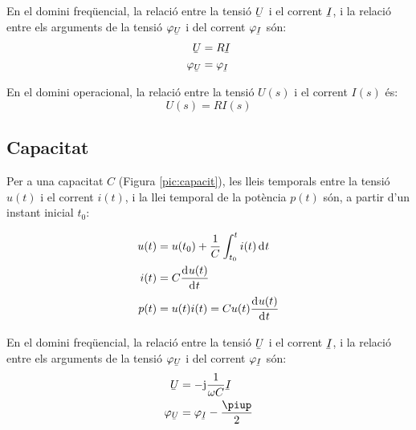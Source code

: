 En el domini freqüencial, la relació entre
la tensió $\cmplx{U}$ i el corrent $\cmplx{I}$, i la relació entre els arguments de
la tensió $\varphi_{\cmplx{U}}$ i del corrent $\varphi_{\cmplx{I}}$ són:
\begin{align}
   \cmplx{U} &= R \cmplx{I} \\ \varphi_{\cmplx{U}} &= \varphi_{\cmplx{I}}
\end{align}

 En el domini operacional, la relació entre la tensió $U(s)$ i el corrent $I(s)$ és:
\begin{equation}
   U(s) = R I(s)
\end{equation}

\subsection{Capacitat} 

Per a una capacitat $C$ (Figura
\vref{pic:capacit}), les lleis temporals entre la tensió $u(t)$ i el
corrent $i(t)$, i la llei temporal de la potència $p(t)$ són, a partir d'un instant inicial $t_0$:

\hfill
\begin{minipage}[b]{5cm}
    
    \label{pic:capacit}
\end{minipage}
\hfill
\begin{minipage}[b][3.8cm][t]{8cm}
   \begin{align}
      u(t) &= u(t_0) + \frac{1}{C} \int_{t_0}^t i(t) \diff t \\
      i(t) &= C \deriv{u(t)}{t} \\
      p(t) &= u(t) i(t) = C u(t) \deriv{u(t)}{t}
   \end{align}
\end{minipage}

En el domini freqüencial, la relació entre la tensió $\cmplx{U}$ i el corrent $\cmplx{I}$, i la relació entre els arguments de la tensió $\varphi_{\cmplx{U}}$ i del corrent $\varphi_{\cmplx{I}}$ són:
\begin{align}
   \cmplx{U} &= -\ju \frac{1}{\omega C} \cmplx{I} \\
   \varphi_{\cmplx{U}} &= \varphi_{\cmplx{I}} - \frac{\piup}{2}
\end{align}

